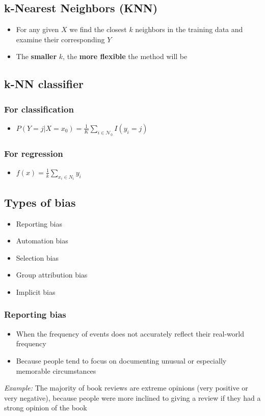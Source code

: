 \documentclass{article}
\begin{document}
    \subsection{k-Nearest Neighbors (KNN)}
    \begin{itemize}
        \item For any given $X$ we find the closest $k$ neighbors in the training data and examine their corresponding $Y$
        \item The \textbf{smaller} $k$, the \textbf{more flexible} the method will be
    \end{itemize}

    \subsection{k-NN classifier}
        \subsubsection{For classification}
        \begin{itemize}
            \item $P(Y = j \vert X = x_0) = \frac{1}{K} \sum_{i \in \mathcal{N}_0} I(y_i = j)$
        \end{itemize}

        \subsubsection{For regression}
        \begin{itemize}
            \item $f(x) = \frac{1}{k} \sum_{x_i \in N_i} y_i$
        \end{itemize}

    \subsection{Types of bias}
    \begin{itemize}
        \item Reporting bias
        \item Automation bias
        \item Selection bias
        \item Group attribution bias
        \item Implicit bias
    \end{itemize}

        \subsubsection{Reporting bias}
        \begin{itemize}
            \item When the frequency of events does not accurately reflect their real-world frequency
            \item Because people tend to focus on documenting unusual or especially memorable circumstances
        \end{itemize}
        \textit{Example:} The majority of book reviews are extreme opinions (very positive or very negative), because people were more inclined to giving a review if they had a strong opinion of the book
\end{document}

